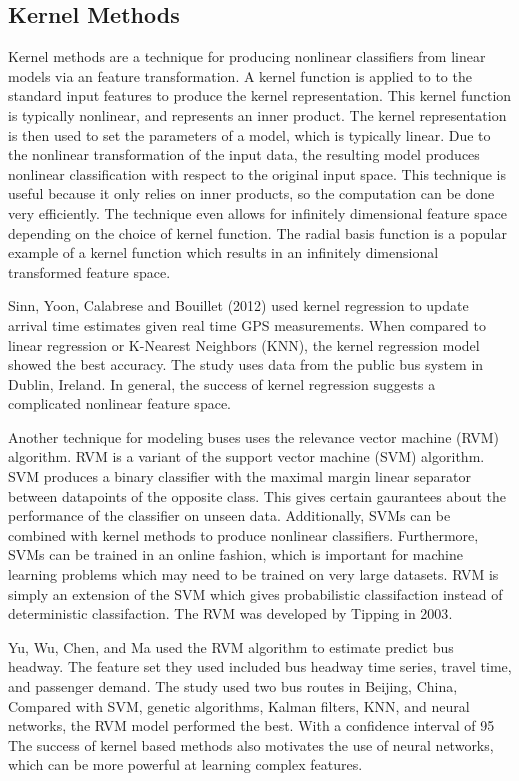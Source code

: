 \subsection{Kernel Methods}

Kernel methods are a technique for producing nonlinear classifiers from linear models via an feature transformation.
A kernel function is applied to to the standard input features to produce the kernel representation.
This kernel function is typically nonlinear, and represents an inner product.
The kernel representation is then used to set the parameters of a model, which is typically linear.
Due to the nonlinear transformation of the input data, the resulting model produces nonlinear classification with respect to the original input space.
This technique is useful because it only relies on inner products, so the computation can be done very efficiently.
The technique even allows for infinitely dimensional feature space depending on the choice of kernel function.
The radial basis function is a popular example of a kernel function which results in an infinitely dimensional transformed feature space.

Sinn, Yoon, Calabrese and Bouillet (2012) used kernel regression to update arrival time estimates given real time GPS measurements\cite{sinn2012predicting}.
When compared to linear regression or K-Nearest Neighbors (KNN), the kernel regression model showed the best accuracy.
The study uses data from the public bus system in Dublin, Ireland.
In general, the success of kernel regression suggests a complicated nonlinear feature space.

Another technique for modeling buses uses the relevance vector machine (RVM) algorithm.
RVM is a variant of the support vector machine (SVM) algorithm.
SVM produces a binary classifier with the maximal margin linear separator between datapoints of the opposite class.
This gives certain gaurantees about the performance of the classifier on unseen data.
Additionally, SVMs can be combined with kernel methods to produce nonlinear classifiers.
Furthermore, SVMs can be trained in an online fashion, which is important for machine learning problems which may need to be trained on very large datasets.
RVM is simply an extension of the SVM which gives probabilistic classifaction instead of deterministic classifaction.
The RVM was developed by Tipping in 2003\cite{tipping2003relevance}.

Yu, Wu, Chen, and Ma used the RVM algorithm to estimate predict bus headway\cite{yu2017probabilistic}.
The feature set they used included bus headway time series, travel time, and passenger demand.
The study used two bus routes in Beijing, China,
Compared with SVM, genetic algorithms, Kalman filters, KNN, and neural networks, the RVM model performed the best.
With a confidence interval of 95%
The success of kernel based methods also motivates the use of neural networks, which can be more powerful at learning complex features.

